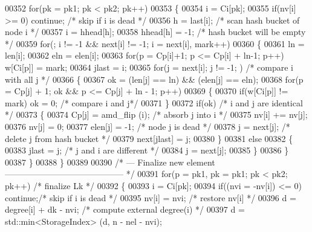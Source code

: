\begin{DoxyCode}
00352     \textcolor{keywordflow}{for}(pk = pk1; pk < pk2; pk++)
00353     \{
00354       i = Ci[pk];
00355       \textcolor{keywordflow}{if}(nv[i] >= 0) \textcolor{keywordflow}{continue};         \textcolor{comment}{/* skip if i is dead */}
00356       h = last[i];                      \textcolor{comment}{/* scan hash bucket of node i */}
00357       i = hhead[h];
00358       hhead[h] = -1;                    \textcolor{comment}{/* hash bucket will be empty */}
00359       \textcolor{keywordflow}{for}(; i != -1 && next[i] != -1; i = next[i], mark++)
00360       \{
00361         ln = len[i];
00362         eln = elen[i];
00363         \textcolor{keywordflow}{for}(p = Cp[i]+1; p <= Cp[i] + ln-1; p++) w[Ci[p]] = mark;
00364         jlast = i;
00365         \textcolor{keywordflow}{for}(j = next[i]; j != -1; ) \textcolor{comment}{/* compare i with all j */}
00366         \{
00367           ok = (len[j] == ln) && (elen[j] == eln);
00368           \textcolor{keywordflow}{for}(p = Cp[j] + 1; ok && p <= Cp[j] + ln - 1; p++)
00369           \{
00370             \textcolor{keywordflow}{if}(w[Ci[p]] != mark) ok = 0;    \textcolor{comment}{/* compare i and j*/}
00371           \}
00372           \textcolor{keywordflow}{if}(ok)                     \textcolor{comment}{/* i and j are identical */}
00373           \{
00374             Cp[j] = amd\_flip (i);  \textcolor{comment}{/* absorb j into i */}
00375             nv[i] += nv[j];
00376             nv[j] = 0;
00377             elen[j] = -1;         \textcolor{comment}{/* node j is dead */}
00378             j = next[j];          \textcolor{comment}{/* delete j from hash bucket */}
00379             next[jlast] = j;
00380           \}
00381           \textcolor{keywordflow}{else}
00382           \{
00383             jlast = j;             \textcolor{comment}{/* j and i are different */}
00384             j = next[j];
00385           \}
00386         \}
00387       \}
00388     \}
00389     
00390     \textcolor{comment}{/* --- Finalize new element------------------------------------------ */}
00391     \textcolor{keywordflow}{for}(p = pk1, pk = pk1; pk < pk2; pk++)   \textcolor{comment}{/* finalize Lk */}
00392     \{
00393       i = Ci[pk];
00394       \textcolor{keywordflow}{if}((nvi = -nv[i]) <= 0) \textcolor{keywordflow}{continue};\textcolor{comment}{/* skip if i is dead */}
00395       nv[i] = nvi;                      \textcolor{comment}{/* restore nv[i] */}
00396       d = degree[i] + dk - nvi;         \textcolor{comment}{/* compute external degree(i) */}
00397       d = std::min<StorageIndex> (d, n - nel - nvi);

\end{DoxyCode}
